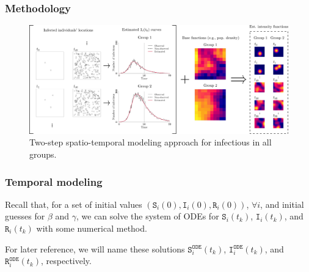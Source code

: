 \documentclass[12pt, aspectratio = 169]{beamer} %
\begin{document}
%		
%		
%		

	\begin{frame}[t]
		\frametitle{Methodology}
		\justifying
		
		\begin{figure}[!ht]
			\centering
			\includegraphics[width = 1\textwidth]{Images/diagram.png}
			\caption{\justifying Two-step\hspace{-1pt} spatio-temporal\hspace{-1pt} modeling\hspace{-1pt} approach for infectious in all groups.}
			\label{fig:diagramST}
		\end{figure}
		
	\end{frame}

		\begin{frame}[t]
		\frametitle{Temporal modeling}
		\justifying
		
		Recall that, for a set of initial values  $(\texttt{S}_i(0), \texttt{I}_i(0), \texttt{R}_i(0))$, $\forall i$, and initial guesses for $\beta$ and $\gamma$, we can solve the system of ODEs for $\texttt{S}_i(t_k)$, $\texttt{I}_i(t_k)$, and $\texttt{R}_i(t_k)$ with some numerical method.
		
		For later reference, we will name these solutions $\texttt{S}_i^{\texttt{ODE}}(t_k)$, $\texttt{I}_i^{\texttt{ODE}}(t_k)$, and $\texttt{R}_i^{\texttt{ODE}}(t_k)$, respectively. 
		
		
		
		
	\end{frame}
	
\end{document}
